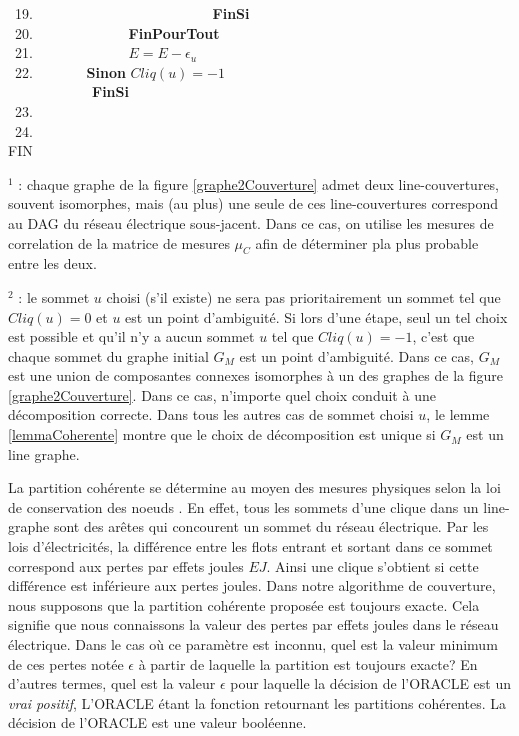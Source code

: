 \begin{algorithm}[!ht]
~19. 	\indent~~~~~~~~~~~~~~~~~~~~~~~~~{\bf FinSi} \\
~20.		\indent ~~~~~~~~~~~~~{\bf FinPourTout}\\
~21.		\indent ~~~~~~~~~~~~~$E = E - \epsilon_u$\\
~22.		\indent            ~~~~~~~{\bf Sinon} $Cliq(u) = -1$\\
	       	\indent~~~~~~~~~~~~{\bf FinSi}\\
~23. \\
~24. \\
\noindent FIN\\
\end{algorithm}

$^1$ : chaque graphe de la figure \ref{graphe2Couverture} admet deux line-couvertures, souvent isomorphes, mais (au plus) une seule de ces line-couvertures correspond au DAG du r\'eseau \'electrique sous-jacent. Dans ce cas, on utilise les mesures de correlation de la matrice de mesures $\mu_C$ afin de d\'eterminer pla plus probable entre les deux.
\newline

 $^2$ :  le sommet $u$ choisi (s'il existe) ne sera pas prioritairement un sommet tel que $Cliq(u) = 0$ et $u$ est un point d'ambiguit\'e. Si lors d'une \'etape, seul un tel choix est possible et qu'il n'y a aucun sommet $u$ tel que $Cliq(u) = -1$, c'est que chaque sommet du graphe initial $G_M$ est un point d'ambiguit\'e.
 Dans ce cas, $G_M$ est une union de composantes connexes isomorphes \`a un des graphes de la figure  \ref{graphe2Couverture}.
Dans ce cas, n'importe quel choix conduit \`a une d\'ecomposition correcte.
Dans tous les autres cas de sommet choisi $u$, le lemme \ref{lemmaCoherente} montre que le choix de d\'ecomposition est unique si $G_M$ est un line graphe.
\newline

La partition coh\'erente se d\'etermine au moyen des mesures physiques selon la loi de conservation des noeuds \cite{loiDeConservation}. 
En effet, tous les sommets d'une clique dans un line-graphe sont des ar\^etes qui concourent un sommet du r\'eseau \'electrique. 
Par les lois d'\'electricit\'es, la diff\'erence entre les flots entrant et sortant dans ce sommet correspond aux pertes par effets joules $EJ$. 
Ainsi une clique s'obtient si cette diff\'erence est inf\'erieure aux pertes joules.
Dans notre algorithme de couverture, nous supposons que la partition coh\'erente propos\'ee est toujours exacte. Cela signifie que nous connaissons la valeur des pertes par effets joules dans le r\'eseau \'electrique. Dans le cas o\`u ce param\`etre est inconnu, quel est la valeur minimum de ces pertes not\'ee $\epsilon$ \`a partir de laquelle la partition est toujours exacte?
En d'autres termes, quel est la valeur $\epsilon$ pour laquelle la d\'ecision de l'ORACLE est un {\em vrai positif}, L'ORACLE \'etant la fonction retournant les partitions coh\'erentes. 
La d\'ecision de l'ORACLE est une valeur bool\'eenne.

